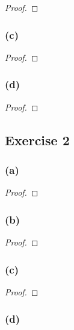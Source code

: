 \documentclass[14pt]{extarticle}
\begin{document}
\begin{proof}

\end{proof}

\subsubsection{(c)}

\begin{proof}

\end{proof}

\subsubsection{(d)}

\begin{proof}

\end{proof}

\subsection{Exercise 2}

\subsubsection{(a)}

\begin{proof}

\end{proof}

\subsubsection{(b)}

\begin{proof}

\end{proof}

\subsubsection{(c)}

\begin{proof}

\end{proof}

\subsubsection{(d)}
\end{document}
